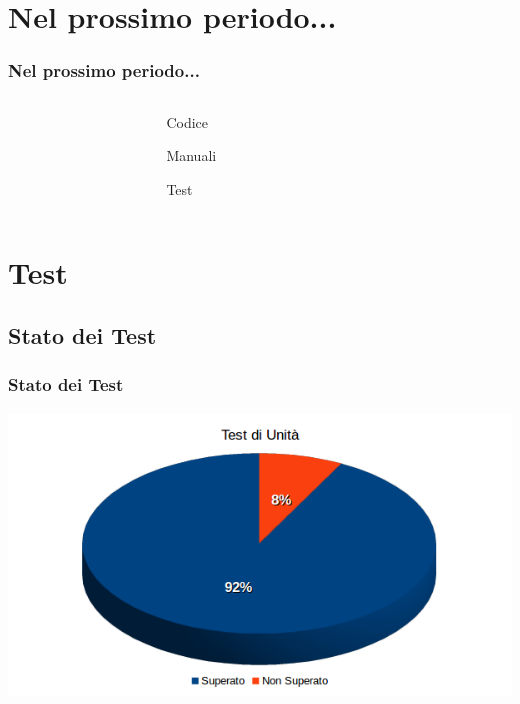 \section{Nel prossimo periodo...}
\begin{frame}
	\frametitle{Nel prossimo periodo...}
	
	\begin{columns}
		\begin{column}{0.4\textwidth}
			
		\end{column}
		
		\begin{column}{0.5\textwidth}
			\begin{itemize}
			\end{itemize}
		\end{column}
		
		\begin{column}{0.2\textwidth}
			
		\end{column}
	\end{columns}
	
\end{frame}

\section{Test}

\subsection{Stato dei Test}
\begin{frame}
	\frametitle{Stato dei Test}
	\begin{center}
	\includegraphics[scale=0.55]{img/TU.png}
	\end{center}
\end{frame}


